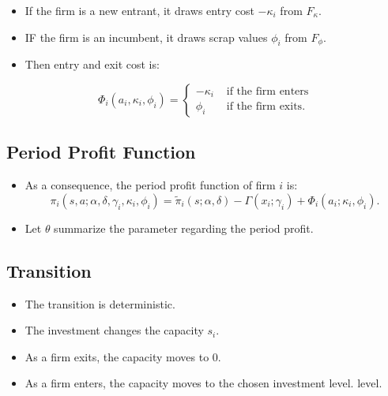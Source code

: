 \documentclass[
]{book}
\providecommand{\tightlist}{%
  \setlength{\itemsep}{0pt}\setlength{\parskip}{0pt}}
\begin{document}
\begin{itemize}
\tightlist
\item
  If the firm is a new entrant, it draws entry cost \(-\kappa_i\) from
  \(F_\kappa\).
\item
  IF the firm is an incumbent, it draws scrap values \(\phi_i\) from
  \(F_\phi\).
\item
  Then entry and exit cost is:
\end{itemize}

\begin{equation}
\Phi_i(a_i, \kappa_i, \phi_i) =
\begin{cases}
- \kappa_i &\text{   if the firm enters}\\
\phi_i &\text{   if the firm exits}.
\end{cases}
\end{equation}

\hypertarget{period-profit-function}{%
\subsection{Period Profit Function}\label{period-profit-function}}

\begin{itemize}
\tightlist
\item
  As a consequence, the period profit function of firm \(i\) is:
  \begin{equation}
  \pi_i(s, a; \alpha, \delta, \gamma_i, \kappa_i, \phi_i) = \tilde{\pi}_i(s; \alpha, \delta) - \Gamma(x_i; \gamma_i) + \Phi_i(a_i; \kappa_i, \phi_i).
  \end{equation}
\item
  Let \(\theta\) summarize the parameter regarding the period profit.
\end{itemize}

\hypertarget{transition}{%
\subsection{Transition}\label{transition}}

\begin{itemize}
\tightlist
\item
  The transition is deterministic.
\item
  The investment changes the capacity \(s_i\).
\item
  As a firm exits, the capacity moves to 0.
\item
  As a firm enters, the capacity moves to the chosen investment level.
  level.
\end{itemize}
\end{document}
